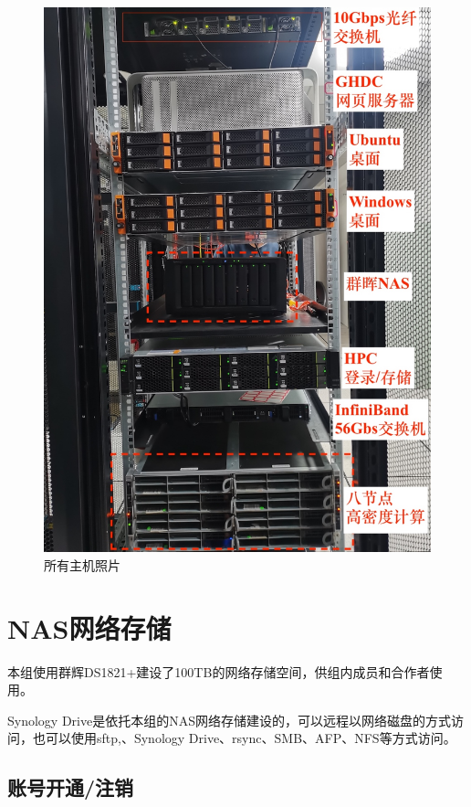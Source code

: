 \documentclass[
]{ctexbook}
\begin{document}
\begin{figure}
\centering
\includegraphics{Fig/ch5/machine.jpeg}
\caption{所有主机照片}
\end{figure}

\hypertarget{nasux7f51ux7edcux5b58ux50a8}{%
\section{NAS网络存储}\label{nasux7f51ux7edcux5b58ux50a8}}

本组使用群辉DS1821+建设了100TB的网络存储空间，供组内成员和合作者使用。

Synology Drive是依托本组的NAS网络存储建设的，可以远程以网络磁盘的方式访问，也可以使用sftp,、Synology Drive、rsync、SMB、AFP、NFS等方式访问。

\hypertarget{ux8d26ux53f7ux5f00ux901aux6ce8ux9500}{%
\subsection{账号开通/注销}\label{ux8d26ux53f7ux5f00ux901aux6ce8ux9500}}
\end{document}
